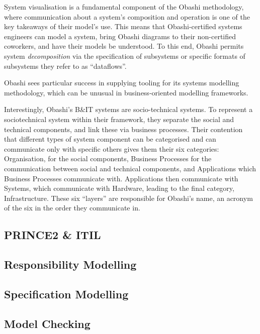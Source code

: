 System visualisation is a fundamental component of the Obashi methodology, where communication about a system's composition and operation is
one of the key takeaways of their model's use. This means that Obashi-certified
systems engineers can model a system, bring Obashi diagrams to their
non-certified coworkers, and have their models be understood. To this end,
Obashi permits system \emph{decomposition} via the specification of subsystems
or specific formats of subsystems they refer to as ``dataflows''.
\par

Obashi sees particular success in supplying tooling for its systems
modelling methodology, which can be unusual in business-oriented modelling
frameworks.
\par

Interestingly, Obashi's B\&IT systems are socio-technical systems. To represent
a sociotechnical system within their framework, they separate the social and
technical components, and link these via business processes. Their contention
that different types of system component can be categorised and can communicate
only with specific others gives them their six categories: Organisation, for the
social components, Business Processes for the communication between social and
technical components, and Applications which Business Processes communicate
with. Applications then communicate with Systems, which communicate with
Hardware, leading to the final category, Infrastructure. These six ``layers''
are responsible for Obashi's name, an acronym of the six in the order they
communicate in.
\par

\subsection{PRINCE2 \& ITIL}



\subsection{Responsibility Modelling}


\subsection{Specification Modelling}


\subsection{Model Checking}


